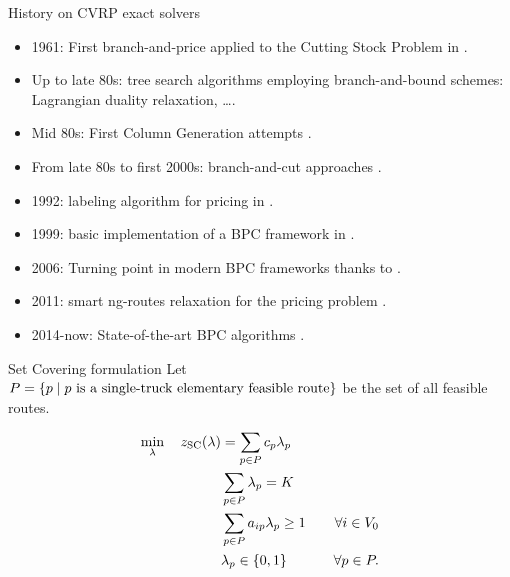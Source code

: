 \begin{frame}{History on CVRP exact solvers}
	\begin{itemize}
		\item 1961: First branch-and-price applied to the Cutting Stock Problem in \cite{gilmore1961}.
		\item Up to late 80s: tree search algorithms employing branch-and-bound schemes: Lagrangian duality relaxation, \dots.
		\item Mid 80s: First Column Generation attempts \parencite{desrosiers1984, agarwal1989setpartitioningbased}.
		\item From late 80s to first 2000s: branch-and-cut approaches \cite{laporte1983, laporte1985, augerat1995approche, araqueg1994, augerat1995, achuthan1996, blasum2000, ralphs2003, achuthan2003, baldacci2004}.
		\item 1992: labeling algorithm for pricing in \cite{desrochers1992}.
		\item 1999: basic implementation of a BPC framework in \cite{kohl1999}.
		\item 2006: Turning point in modern BPC frameworks thanks to \parencite{fukasawa2006}.
		\item 2011: smart ng-routes relaxation for the pricing problem \parencite{baldacci2011}.
		\item 2014-now: State-of-the-art BPC algorithms \parencite{contardo2014,pecin2017improved,pecin2017new,pessoa2020,sadykov2021,pessoa2020generic}.
	\end{itemize}
\end{frame}

\begin{frame}{Set Covering formulation}
	Let $P = \Set*{p \mid p\ \text{is a single-truck elementary feasible route}}$ be the set of all feasible routes.

	\begin{align}
		\min_{\lambda} \quad z_\mt{SC}(\lambda) & = \sum_{p \in P}  c_p \lambda_p              & \label{eq:set-covering-obj-func}                                                       \\
		                                        & \sum_{p \in P} \lambda_{p} = K               & \label{eq:set-covering-K-routes}                                                       \\
		                                        & \sum_{p \in P}  a_{ip} \lambda_p \ge 1       & \quad \forall i \in V_0 \label{eq:set-covering-customers-visited-by-exactly-one-route} \\
		                                        & \lambda_p                    \in \Set*{0, 1} & \quad \forall p \in P \label{eq:set-covering-lambda-mip-var-bounds}.
	\end{align}
\end{frame}

